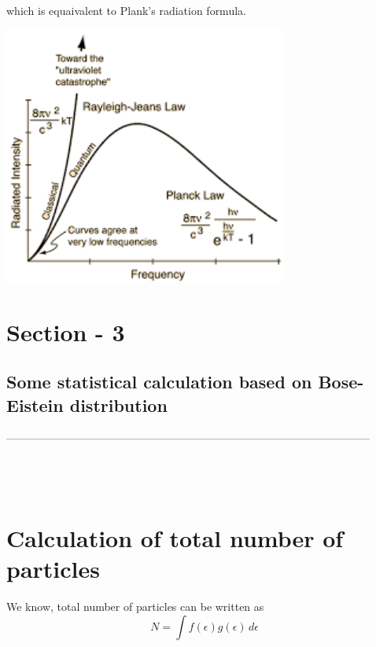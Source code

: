 \documentclass[12pt, letterpaper]{article}
\begin{document}
    which is equaivalent to Plank's radiation formula.
    \begin{adjustbox}{center,caption={Plank's law graph},label={somelabel},nofloat=figure,vspace=\bigskipamount}
        \includegraphics[width=0.7\textwidth]{fig4}
    \end{adjustbox}

    \newpage
    \section*{Section - 3}
    \subsection*{Some statistical calculation based on Bose-Eistein distribution}
    \noindent
    --------------------------------------------------------------------------------------------------- \\ 
    \\
    \\
    \\

    \section*{ Calculation of total number of particles}
    We know, total number of particles can be written as 
    \begin{equation}
        N = \int f(\epsilon) g(\epsilon) \,d\epsilon 
    \end{equation}
\end{document}
